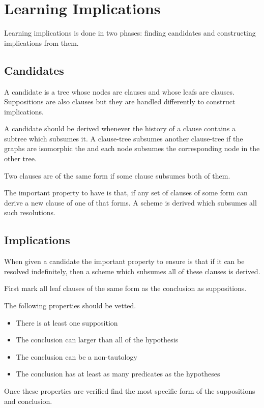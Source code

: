 \documentclass{article}
\begin{document}
\section{Learning Implications}

Learning implications is done in two phases: finding candidates and constructing implications from them.
 
\subsection{Candidates}

A candidate is a tree whose nodes are clauses and whose leafs are clauses.
Suppositions are also clauses but they are handled differently to construct implications.
  
A candidate should be derived whenever the history of a clause contains a subtree which subsumes it.
A clause-tree subsumes another clause-tree
  if the graphs are isomorphic the and each node subsumes the corresponding node in the other tree.

Two clauses are of the same form if some clause subsumes both of them.

The important property to have is that,
if any set of clauses of some form can derive a new clause of one of that forms.
A scheme is derived which subsumes all such resolutions.

\subsection{Implications}

When given a candidate the important property to ensure is that if it can be resolved indefinitely,
then a scheme which subsumes all of these clauses is derived.

First mark all leaf clauses of the same form as the conclusion as suppositions.

The following properties should be vetted.
\begin{itemize}
  \item There is at least one supposition
  \item The conclusion can larger than all of the hypothesis
  \item The conclusion can be a non-tautology
  \item The conclusion has at least as many predicates as the hypotheses
\end{itemize}

Once these properties are verified find the most specific form of the suppositions and conclusion.
\end{document}
